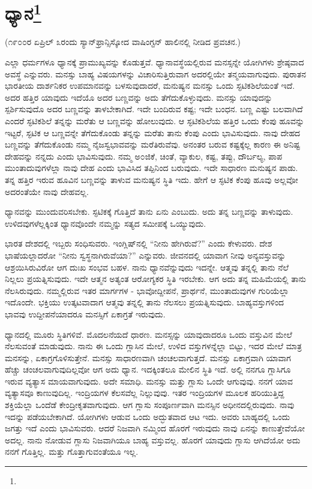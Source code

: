 
\chapter[ಧ್ಯಾನ]{ಧ್ಯಾನ\protect\footnote{}}

\begin{center}
(೧೯೦೦ರ ಏಪ್ರಿಲ್ ೩ರಂದು ಸ್ಯಾನ್‌ಫ್ರಾನ್ಸಿಸ್ಕೋದ ವಾಷಿಂಗ್ಟನ್ ಹಾಲಿನಲ್ಲಿ ನೀಡಿದ ಪ್ರವಚನ.)
\end{center}

ಎಲ್ಲಾ ಧರ್ಮಗಳೂ ಧ್ಯಾನಕ್ಕೆ ಪ್ರಾಮುಖ್ಯವನ್ನು ಕೊಡುತ್ತವೆ. ಧ್ಯಾನಾವಸ್ಥೆಯಲ್ಲಿರುವ ಮನಸ್ಸನ್ನೇ ಯೋಗಿಗಳು ಶ್ರೇಷ್ಠವಾದ ಅವಸ್ಥೆ ಎನ್ನುವರು. ಮನಸ್ಸು ಬಾಹ್ಯ ವಿಷಯಗಳನ್ನು ವಿಚಾರಿಸುತ್ತಿರುವಾಗ ಅದರಲ್ಲಿಯೇ ತನ್ಮಯವಾಗುವುದು. ಪುರಾತನ ಭಾರತೀಯ ದಾರ್ಶನಿಕರ ಉಪಮಾನವನ್ನು ಬಳಸುವುದಾದರೆ, ಮನುಷ್ಯನ ಮನಸ್ಸು ಒಂದು ಸ್ಫಟಿಕಶಿಲೆಯಂತೆ ಇದೆ. ಅದರ ಹತ್ತಿರ ಯಾವುದು ಇದೆಯೊ ಅದರ ಬಣ್ಣವನ್ನು ಅದು ತೆಗೆದುಕೊಳ್ಳುವುದು. ಮನಸ್ಸು ಯಾವುದನ್ನು ಸ್ಪರ್ಶಿಸುವುದೊ ಅದರ ಬಣ್ಣವನ್ನು ತಾಳಬೇಕಾಗಿದೆ. ಇದೇ ಬಂದಿರುವ ಕಷ್ಟ; ಇದೇ ಬಂಧನ. ಬಣ್ಣ ಎಷ್ಟು ಬಲವಾಗಿದೆ ಎಂದರೆ ಸ್ಫಟಿಕಶಿಲೆ ತನ್ನನ್ನು ಮರೆತು ಆ ಬಣ್ಣವನ್ನು ಹೋಲುವುದು. ಆ ಸ್ಫಟಿಕಶಿಲೆಯ ಹತ್ತಿರ ಒಂದು ಕೆಂಪು ಹೂವನ್ನು ಇಟ್ಟರೆ, ಸ್ಫಟಿಕ ಆ ಬಣ್ಣವನ್ನೇ ತೆಗೆದುಕೊಂಡು ತನ್ನನ್ನು ಮರೆತು ತಾನು ಕೆಂಪು ಎಂದು ಭಾವಿಸುವುದು. ನಾವು ದೇಹದ ಬಣ್ಣವನ್ನು ತೆಗೆದುಕೊಂಡು ನಮ್ಮ ನೈಜಸ್ವಭಾವವನ್ನು ಮರೆತಿರುವೆವು. ಅನಂತರ ಬರುವ ಕಷ್ಟಕ್ಕೆಲ್ಲ ಕಾರಣ ಈ ಅನಿಷ್ಟ ದೇಹವನ್ನು ನನ್ನದು ಎಂದು ಭಾವಿಸುವುದು. ನಮ್ಮ ಅ೦ಜಿಕೆ, ಚಿಂತೆ, ವ್ಯಾಕುಲ, ಕಷ್ಟ, ತಪ್ಪು, ದೌರ್ಬಲ್ಯ, ಪಾಪ ಮುಂತಾದುವುಗಳೆಲ್ಲಾ ನಾವು ದೇಹ ಎಂದು ಭಾವಿಸಿದ ತಪ್ಪಿನಿಂದ ಬರುವುದು. ಇದೇ ಸಾಧಾರಣ ಮನುಷ್ಯನ ಪಾಡು. ತನ್ನ ಹತ್ತಿರ ಇರುವ ಹೂವಿನ ಬಣ್ಣವನ್ನು ತಾಳುವ ಮನುಷ್ಯನ ಸ್ಥಿತಿ ಇದು. ಹೇಗೆ ಆ ಸ್ಫಟಿಕ ಕೆಂಪು ಹೂವು ಅಲ್ಲವೋ ಅದರಂತೆಯೇ ನಾವು ದೇಹವಲ್ಲ.

ಧ್ಯಾನವನ್ನು ಮುಂದುವರಿಸಬೇಕು. ಸ್ಫಟಿಕಕ್ಕೆ ಗೊತ್ತಿದೆ ತಾನು ಏನು ಎಂಬುದು. ಅದು ತನ್ನ ಬಣ್ಣವನ್ನು ತಾಳುವುದು. ಉಳಿದವುಗಳೆಲ್ಲಕ್ಕಿಂತ ಧ್ಯಾನವೊಂದೇ ನಮ್ಮನ್ನು ಸತ್ಯದ ಸಮೀಪಕ್ಕೆ ಒಯ್ಯುವುದು.

ಭಾರತ ದೇಶದಲ್ಲಿ ಇಬ್ಬರು ಸಂಧಿಸುವರು. ಇಂಗ್ಲಿಷ್‌ನಲ್ಲಿ “ನೀನು ಹೇಗಿರುವೆ?” ಎಂದು ಕೇಳುವರು. ದೇಶ ಭಾಷೆಯಲ್ಲಾದರೋ “ನೀನು ಸ್ವಸ್ಥನಾಗಿರುವೆಯಾ?” ಎನ್ನುವರು. ಜೀವನದಲ್ಲಿ ಯಾವಾಗ ನೀವು ಅನ್ಯವಸ್ತುವನ್ನು ಆಶ್ರಯಿಸಿರುವಿರೋ ಆಗ ದುಃಖ ಸಂಭವ ಬಹಳ. ನಾನು ಧ್ಯಾನವೆನ್ನುವುದು ಇದನ್ನೇ. ಆತ್ಮವು ತನ್ನಲ್ಲಿ ತಾನು ನೆಲೆ ನಿಲ್ಲಲು ಪ್ರಯತ್ನಿಸುವುದು. ಇದೇ ಆತ್ಮನ ಅತ್ಯಂತ ಆರೋಗ್ಯಕರ ಸ್ಥಿತಿ ಇರಬೇಕು. ಆಗ ಅದು ತನ್ನ ಮಹಿಮೆಯಲ್ಲಿ ತಾನು ನೆಲಸಿರುವುದು. ನಮ್ಮಲ್ಲಿರುವ ಇತರ ಮಾರ್ಗಗಳ - ಭಾವೋದ್ದೀಪನೆ, ಪ್ರಾರ್ಥನೆ, ಮುಂತಾದುವುಗಳ ಗುರಿಯೆಲ್ಲಾ ಇದೊಂದೇ. ಭಕ್ತಿಯು ಉತ್ಕಟವಾದಾಗ ಆತ್ಮವು ತನ್ನಲ್ಲಿ ತಾನು ನೆಲಸಲು ಪ್ರಯತ್ನಿಸುವುದು. ಬಾಹ್ಯವಸ್ತುಗಳಿಂದ ಭಾವವು ಉದ್ದೀಪನೆಯಾದರೂ ಮನಸ್ಸಿಗೆ ಏಕಾಗ್ರತೆ ಇರುವುದು.

ಧ್ಯಾನದಲ್ಲಿ ಮೂರು ಸ್ಥಿತಿಗಳಿವೆ. ಮೊದಲನೆಯದೆ ಧಾರಣ. ಮನಸ್ಸನ್ನು ಯಾವುದಾದರೂ ಒಂದು ವಸ್ತುವಿನ ಮೇಲೆ ನೆಲಸುವಂತೆ ಮಾಡುವುದು. ನಾನು ಈ ಒಂದು ಗ್ಲಾಸಿನ ಮೇಲೆ, ಉಳಿದ ವಸ್ತುಗಳನ್ನೆಲ್ಲಾ ಬಿಟ್ಟು, ಇದರ ಮೇಲೆ ಮಾತ್ರ ಮನಸನ್ನು, ಏಕಾಗ್ರಗೊಳಿಸುತ್ತೇನೆ. ಮನಸ್ಸು ಸಾಧಾರಣವಾಗಿ ಚಂಚಲವಾಗುತ್ತದೆ. ಮನಸ್ಸು ಏಕಾಗ್ರವಾಗಿ ಯಾವಾಗ ಹೆಚ್ಚು ಚಂಚಲವಾಗುವುದಿಲ್ಲವೋ ಆಗ ಅದು ಧ್ಯಾನ. ಇದಕ್ಕಿಂತಲೂ ಮೇಲಿನ ಸ್ಥಿತಿ ಇದೆ. ಅಲ್ಲಿ ನನಗೂ ಗ್ಲಾಸಿಗೂ ಇರುವ ವ್ಯತ್ಯಾಸ ಮಾಯವಾಗುವುದು. ಅದೇ ಸಮಾಧಿ. ಮನಸ್ಸು ಮತ್ತು ಗ್ಲಾಸು ಒಂದೇ ಆಗುವುವು. ನನಗೆ ಯಾವ ವ್ಯತ್ಯಾಸವೂ ಕಾಣುವುದಿಲ್ಲ. ಇಂದ್ರಿಯಗಳ ಕೆಲಸವೆಲ್ಲ ನಿಲ್ಲುವುವು. ಇತರ ಇಂದ್ರಿಯಗಳ ಮೂಲಕ ಹರಿಯುತ್ತಿದ್ದ ಶಕ್ತಿಯೆಲ್ಲಾ ಒಂದೆಡೆ ಕೇಂದ್ರೀಕೃತವಾಗುವುದು. ಆಗ ಗ್ಲಾಸು ಸಂಪೂರ್ಣವಾಗಿ ಮನಸ್ಸಿನ ಅಧೀನದಲ್ಲಿರುವುದು. ನಾವು ಇದನ್ನು ಪಡೆಯಬೇಕಾಗಿದೆ. ಯೋಗಿಗಳು ಆಡುವ ಒಂದು ಅದ್ಭುತವಾದ ಆಟ ಇದು. ಅವರು ಬಾಹ್ಯದಲ್ಲಿ ಒಂದು ಜಗತ್ತು ಇದೆ ಎಂದು ಭಾವಿಸುವರು. ಆದರೆ ನಿಜವಾಗಿ ನಮ್ಮಿಂದ ಹೊರಗೆ ಇರುವುದು ನಾವು ಏನನ್ನು ಕಾಣುತ್ತೇವೆಯೋ ಅದಲ್ಲ. ನಾನು ನೋಡುವ ಗ್ಲಾಸು ನಿಜವಾಗಿಯೂ ಬಾಹ್ಯ ವಸ್ತುವಲ್ಲ. ಹೊರಗೆ ಯಾವುದು ಗ್ಲಾಸು ಆಗಿದೆಯೋ ಅದು ನನಗೆ ಗೊತ್ತಿಲ್ಲ. ಮತ್ತು ಗೊತ್ತಾಗುವಂತೆಯೂ ಇಲ್ಲ.

